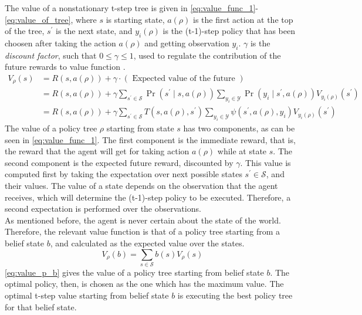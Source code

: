 The value of a nonstationary t-step tree is given in \autoref{eq:value_func_1}-\autoref{eq:value_of_tree}, where $ s $ is starting state, $ a(\rho) $ is the first action at the top of the tree, $ s^\prime $ is the next state, and $ y_{i}(\rho) $ is the (t-1)-step policy that has been choosen after taking the action $ a(\rho) $ and getting observation $ y_i $. $ \gamma $ is the \textit{discount factor}, such that $ 0\leq \gamma \leq 1 $, used to regulate the contribution of the future rewards to value function \cite{Sutton2018}.
\begin{align} 
V_{\rho}(s) &=R(s, a(\rho))+\gamma \cdot(\text { Expected value of the future }) \label{eq:value_func_1}\\
&=R(s, a(\rho))+\gamma \sum_{s^{\prime} \in \mathcal{S}} \operatorname{Pr}\left(s^{\prime} \mid s, a(\rho)\right) \sum_{y_{i} \in \mathcal{Y}} \operatorname{Pr}\left(y_{i} \mid s^{\prime}, a(\rho)\right) V_{y_{i}(\rho)}\left(s^{\prime}\right) \label{eq:value_func_2}\\
&=R(s, a(\rho))+\gamma \sum_{s^{\prime} \in \mathcal{S}} T\left(s, a(\rho), s^{\prime}\right) \sum_{y_{i} \in \mathcal{Y}} \psi\left(s^{\prime}, a(\rho), y_{i}\right) V_{y_{i}(\rho)}\left(s^{\prime}\right) 
\label{eq:value_of_tree}
\end{align}
The value of a policy tree $ \rho $ starting from state $ s $ has two components, as can be seen in \autoref{eq:value_func_1}. The first component is the immediate reward, that is, the reward that the agent will get for taking action $ a(\rho) $ while at state $ s $. The second component is the expected future reward, discounted by $ \gamma $. This value is computed first by taking the expectation over next possible states $ s^\prime \in \mathcal{S} $, and their values. The value of a state depends on the observation that the agent receives, which will determine the (t-1)-step policy to be executed. Therefore, a second expectation is performed over the observations. \\
As mentioned before, the agent is never certain about the state of the world. Therefore, the relevant value function is that of a policy tree starting from a belief state $ b $, and  calculated as the expected value over the states.
\begin{equation}
V_{\rho}(b)=\sum_{s \in \mathcal{S}} b(s) V_{\rho}(s)
\label{eq:value_p_b}
\end{equation}
\autoref{eq:value_p_b} gives the value of a policy tree starting from belief state $ b $. The optimal policy, then, is chosen as the one which has the maximum value. The optimal t-step value starting from belief state $ b $ is executing the best policy tree for that belief state.
